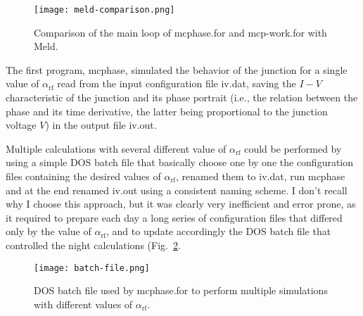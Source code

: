 \begin{figure}[bt]
	\centering
	\texttt{[image: meld-comparison.png]}
	\caption{Comparison of the main loop of \textsf{mcphase.for} and \textsf{mcp-work.for} with Meld.}
	\label{fig:meld-comparison}
\end{figure}


The first program, \textsf{mcphase}, simulated the behavior of the junction for a single value of $\alpha_\mathrm{rf}$ read from the input configuration file \textsf{iv.dat}, saving the $I - V$ characteristic of the junction and its phase portrait (i.e., the relation between the phase and its time derivative, the latter being proportional to the junction voltage $V$) in the output file \textsf{iv.out}.

Multiple calculations with several different value of $\alpha_\mathrm{rf}$ could be performed by using a simple DOS batch file that basically choose one by one the configuration files containing the desired values of $\alpha_\mathrm{rf}$, renamed them to \textsf{iv.dat}, run \textsf{mcphase} and at the end renamed \textsf{iv.out} using a consistent naming scheme.
I don't recall why I choose this approach, but it was clearly very inefficient and error prone, as it required to prepare each day a long series of configuration files that differed only by the value of $\alpha_\mathrm{rf}$, and to update accordingly the DOS batch file that controlled the night calculations (Fig.~\ref{fig:batch-file}.

\begin{figure}[tbh]
	\centering
	\texttt{[image: batch-file.png]}
	\caption{DOS batch file used by \textsf{mcphase.for} to perform multiple simulations with different values of $\alpha_\mathrm{rf}$.}
	\label{fig:batch-file}
\end{figure}


